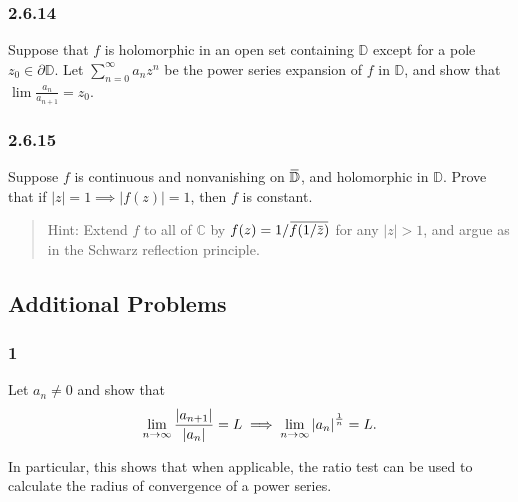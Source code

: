 \hypertarget{section-41}{%
\subsubsection{2.6.14}\label{section-41}}

Suppose that \(f\) is holomorphic in an open set containing
\({\mathbb{D}}\) except for a pole \(z_0 \in {{\partial}}{\mathbb{D}}\).
Let \(\sum_{n=0}^\infty a_n z^n\) be the power series expansion of \(f\)
in \({\mathbb{D}}\), and show that \(\lim \frac{a_n}{a_{n+1}} = z_0\).

\hypertarget{section-42}{%
\subsubsection{2.6.15}\label{section-42}}

Suppose \(f\) is continuous and nonvanishing on
\(\mkern 1.5mu\overline{\mkern-1.5mu{\mathbb{D}}\mkern-1.5mu}\mkern 1.5mu\),
and holomorphic in \({\mathbb{D}}\). Prove that if
\({\left\lvert {z} \right\rvert} = 1 \implies {\left\lvert {f(z)} \right\rvert} = 1\),
then \(f\) is constant.

\begin{quote}
Hint: Extend \(f\) to all of \({\mathbb{C}}\) by
\(f(z) = 1/ \mkern 1.5mu\overline{\mkern-1.5muf(1/\mkern 1.5mu\overline{\mkern-1.5muz\mkern-1.5mu}\mkern 1.5mu)\mkern-1.5mu}\mkern 1.5mu\)
for any \({\left\lvert {z} \right\rvert} > 1\), and argue as in the
Schwarz reflection principle.
\end{quote}

\hypertarget{additional-problems}{%
\subsection{Additional Problems}\label{additional-problems}}

\hypertarget{section-43}{%
\subsubsection{1}\label{section-43}}

Let \(a_n\neq 0\) and show that
\begin{align*}
\lim_{n\to \infty} {{\left\lvert {a_{n+1}} \right\rvert} \over {\left\lvert {a_n} \right\rvert}} = L \implies \lim_{n\to\infty} {\left\lvert {a_n} \right\rvert}^{1\over n} = L
.\end{align*}

In particular, this shows that when applicable, the ratio test can be
used to calculate the radius of convergence of a power series.

